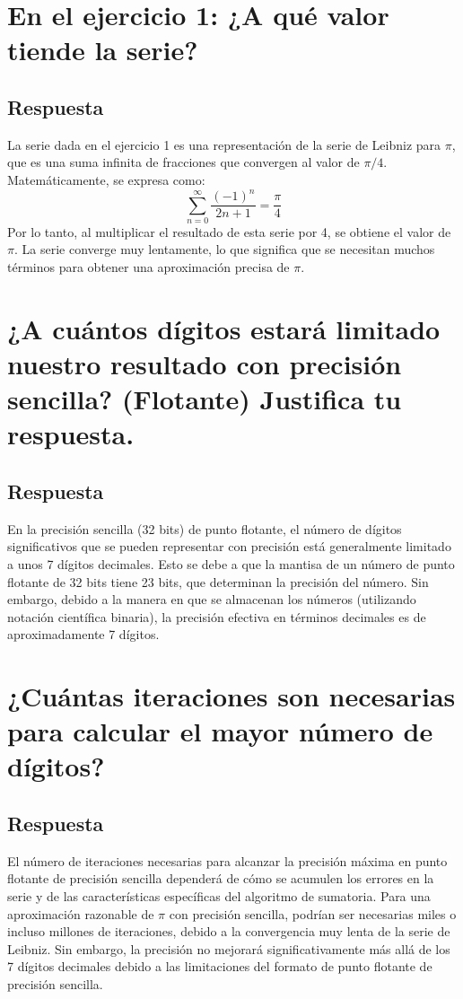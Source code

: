 \documentclass{article}
\begin{document}
\section{En el ejercicio 1: ¿A qué valor tiende la serie?}
\subsection{Respuesta}
La serie dada en el ejercicio 1 es una representación de la serie de Leibniz para $\pi$, que es una suma infinita de fracciones que convergen al valor de $\pi/4$. Matemáticamente, se expresa como:
\[
\sum_{n=0}^\infty \frac{(-1)^n}{2n+1} = \frac{\pi}{4}
\]
Por lo tanto, al multiplicar el resultado de esta serie por 4, se obtiene el valor de $\pi$. La serie converge muy lentamente, lo que significa que se necesitan muchos términos para obtener una aproximación precisa de $\pi$.

\section{¿A cuántos dígitos estará limitado nuestro resultado con precisión sencilla? (Flotante) Justifica tu respuesta.}
\subsection{Respuesta}
En la precisión sencilla (32 bits) de punto flotante, el número de dígitos significativos que se pueden representar con precisión está generalmente limitado a unos 7 dígitos decimales. Esto se debe a que la mantisa de un número de punto flotante de 32 bits tiene 23 bits, que determinan la precisión del número. Sin embargo, debido a la manera en que se almacenan los números (utilizando notación científica binaria), la precisión efectiva en términos decimales es de aproximadamente 7 dígitos.

\section{¿Cuántas iteraciones son necesarias para calcular el mayor número de dígitos?}
\subsection{Respuesta}
El número de iteraciones necesarias para alcanzar la precisión máxima en punto flotante de precisión sencilla dependerá de cómo se acumulen los errores en la serie y de las características específicas del algoritmo de sumatoria. Para una aproximación razonable de $\pi$ con precisión sencilla, podrían ser necesarias miles o incluso millones de iteraciones, debido a la convergencia muy lenta de la serie de Leibniz. Sin embargo, la precisión no mejorará significativamente más allá de los 7 dígitos decimales debido a las limitaciones del formato de punto flotante de precisión sencilla.
\end{document}
